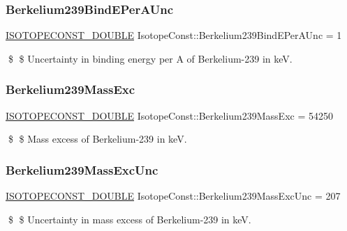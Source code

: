 \subsubsection{\texorpdfstring{Berkelium239\+Bind\+E\+Per\+A\+Unc}{Berkelium239BindEPerAUnc}}
{\footnotesize\ttfamily \mbox{\hyperlink{group___isotope_const-_macros_ga8f45a7272ce02c0b4c65c44636ed719a}{I\+S\+O\+T\+O\+P\+E\+C\+O\+N\+S\+T\+\_\+\+D\+O\+U\+B\+LE}} Isotope\+Const\+::\+Berkelium239\+Bind\+E\+Per\+A\+Unc = 1}

\$ \$ Uncertainty in binding energy per A of Berkelium-\/239 in keV. \mbox{\label{group___isotope_const-_berkelium-_bk239_ga51cc5c684309ff97e5969083f61fd333}} 
\subsubsection{\texorpdfstring{Berkelium239\+Mass\+Exc}{Berkelium239MassExc}}
{\footnotesize\ttfamily \mbox{\hyperlink{group___isotope_const-_macros_ga8f45a7272ce02c0b4c65c44636ed719a}{I\+S\+O\+T\+O\+P\+E\+C\+O\+N\+S\+T\+\_\+\+D\+O\+U\+B\+LE}} Isotope\+Const\+::\+Berkelium239\+Mass\+Exc = 54250}

\$ \$ Mass excess of Berkelium-\/239 in keV. \mbox{\label{group___isotope_const-_berkelium-_bk239_gace668ae8d4b107192daa76e18b2bd0dd}} 
\subsubsection{\texorpdfstring{Berkelium239\+Mass\+Exc\+Unc}{Berkelium239MassExcUnc}}
{\footnotesize\ttfamily \mbox{\hyperlink{group___isotope_const-_macros_ga8f45a7272ce02c0b4c65c44636ed719a}{I\+S\+O\+T\+O\+P\+E\+C\+O\+N\+S\+T\+\_\+\+D\+O\+U\+B\+LE}} Isotope\+Const\+::\+Berkelium239\+Mass\+Exc\+Unc = 207}

\$ \$ Uncertainty in mass excess of Berkelium-\/239 in keV. \mbox{\label{group___isotope_const-_berkelium-_bk239_ga90fa7b16405b16dd6a933e43143ffe3f}} 
